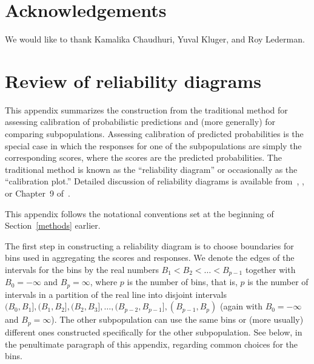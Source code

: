 \documentclass[]{fairmeta}
\begin{document}
\section*{Acknowledgements}

We would like to thank Kamalika Chaudhuri, Yuval Kluger, and Roy Lederman.



\pagebreak



\appendix
\section{Review of reliability diagrams}
\label{reliability_diagrams}

This appendix summarizes the construction from the traditional method
for assessing calibration of probabilistic predictions and (more generally)
for comparing subpopulations. Assessing calibration of predicted probabilities
is the special case in which the responses for one of the subpopulations are
simply the corresponding scores, where the scores are
the predicted probabilities. The traditional method is known as
the ``reliability diagram'' or occasionally as the ``calibration plot.''
Detailed discussion of reliability diagrams is available
from~\cite{brocker-smith}, \cite{brocker}, or Chapter~9 of~\cite{wilks}.

This appendix follows the notational conventions set at the beginning
of Section~\ref{methods} earlier.

The first step in constructing a reliability diagram is to choose boundaries
for bins used in aggregating the scores and responses.
We denote the edges of the intervals for the bins by the real numbers
$B_1 < B_2 < \dots < B_{p-1}$ together with $B_0 = -\infty$ and $B_p = \infty$,
where $p$ is the number of bins, that is, $p$ is the number of intervals
in a partition of the real line into disjoint intervals
$(B_0, B_1], (B_1, B_2], (B_2, B_3], \dots, (B_{p-2}, B_{p-1}], (B_{p-1}, B_p)$
(again with $B_0 = -\infty$ and $B_p = \infty$).
The other subpopulation can use the same bins or (more usually) different ones
constructed specifically for the other subpopulation.
See below, in the penultimate paragraph of this appendix,
regarding common choices for the bins.
\end{document}
